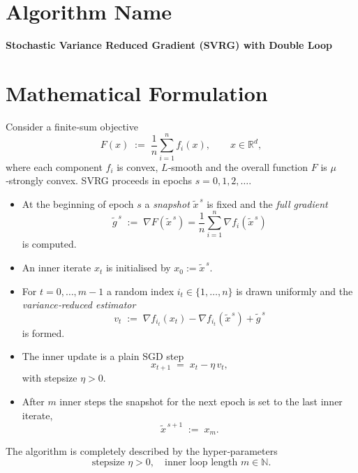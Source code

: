 \documentclass[11pt]{article}
\newcommand{\R}{\mathbb{R}}
\begin{document}
\section*{Algorithm Name}
\textbf{Stochastic Variance Reduced Gradient (SVRG) with Double Loop}

\section*{Mathematical Formulation}
Consider a finite‑sum objective
\[
F(x)\;:=\;\frac{1}{n}\sum_{i=1}^{n}f_i(x),\qquad x\in\R^{d},
\]
where each component $f_i$ is convex, $L$‑smooth and the overall function $F$ is $\mu$‑strongly convex.
SVRG proceeds in epochs $s=0,1,2,\dots$.
\begin{itemize}
\item At the beginning of epoch $s$ a \emph{snapshot} $\tilde{x}^{\,s}$ is fixed and the \emph{full gradient}
\[
\tilde{g}^{\,s}\;:=\;\nabla F(\tilde{x}^{\,s})=\frac{1}{n}\sum_{i=1}^{n}\nabla f_i(\tilde{x}^{\,s})
\tag{1}
\]
is computed.
\item An inner iterate $x_t$ is initialised by $x_0:=\tilde{x}^{\,s}$.
\item For $t=0,\dots,m-1$ a random index $i_t\in\{1,\dots,n\}$ is drawn uniformly and the
\emph{variance‑reduced estimator}
\[
v_t\;:=\;\nabla f_{i_t}(x_t)-\nabla f_{i_t}(\tilde{x}^{\,s})+\tilde{g}^{\,s}
\tag{2}
\]
is formed.
\item The inner update is a plain SGD step
\[
x_{t+1}\;=\;x_t-\eta\,v_t,
\tag{3}
\]
with stepsize $\eta>0$.
\item After $m$ inner steps the snapshot for the next epoch is set to the last inner iterate,
\[
\tilde{x}^{\,s+1}\;:=\;x_m .
\tag{4}
\]
\end{itemize}

The algorithm is completely described by the hyper‑parameters
\[
\boxed{\text{stepsize }\eta>0,\quad\text{inner loop length }m\in\mathbb{N}.}
\]

\end{document}
